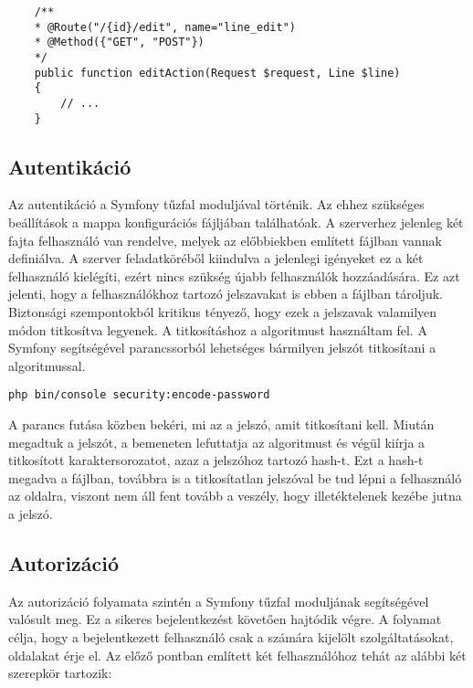 \begin{lstlisting}
    /**
    * @Route("/{id}/edit", name="line_edit")
    * @Method({"GET", "POST"})
    */
    public function editAction(Request $request, Line $line)
    {
        // ...
    }
\end{lstlisting}

\subsection*{Autentikáció}
\label{authentication}

Az autentikáció a Symfony tűzfal moduljával történik. 
Az ehhez szükséges beállítások a  mappa  konfigurációs fájljában találhatóak. 
A szerverhez jelenleg két fajta felhasználó van rendelve, melyek az előbbiekben említett fájlban vannak definiálva.
A szerver feladatköréből kiindulva a jelenlegi igényeket ez a két felhasználó kielégíti, ezért nincs szükség újabb felhasználók hozzáadására. 
Ez azt jelenti, hogy a felhasználókhoz tartozó jelszavakat is ebben a fájlban tároljuk. 
Biztonsági szempontokból kritikus tényező, hogy ezek a jelszavak valamilyen módon titkosítva legyenek. 
A titkosításhoz a  algoritmust használtam fel. 
A Symfony segítségével parancssorból lehetséges bármilyen jelszót titkosítani a  algoritmussal. 

\begin{lstlisting}
php bin/console security:encode-password
\end{lstlisting}

A parancs futása közben bekéri, mi az a jelszó, amit titkosítani kell. 
Miután megadtuk a jelszót, a bemeneten lefuttatja az algoritmust és végül kiírja a titkosított karaktersorozatot, azaz a jelszóhoz tartozó hash-t.
Ezt a hash-t megadva a fájlban, továbbra is a titkosítatlan jelszóval be tud lépni a felhasználó az oldalra, viszont nem áll fent tovább a veszély, hogy illetéktelenek kezébe jutna a jelszó. 

\subsection*{Autorizáció}
\label{authorization}

Az autorizáció folyamata szintén a Symfony tűzfal moduljának segítségével valósult meg. 
Ez a sikeres bejelentkezést követően hajtódik végre. 
A folyamat célja, hogy a bejelentkezett felhasználó csak a számára kijelölt szolgáltatásokat, oldalakat érje el. 
Az előző pontban említett két felhasználóhoz tehát az alábbi két szerepkör tartozik:

